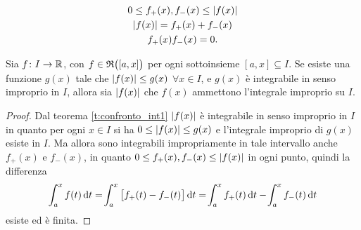 \[\begin{gathered}
0\leq f_+(x),f_-(x)\leq\left|{f(x)}\right|\\
\left|{f(x)}\right|=f_+(x)+f_-(x)\\
f_+(x)f_-(x)=0.
\end{gathered}\]
\begin{teorema} \label{t:confronto_int2}
Sia $f\colon I\to\mathbb{R}$, con $f\in\mathfrak{R}\big([a,x]\big)$ per ogni sottoinsieme $[a,x]\subseteq I$.
Se esiste una funzione $g(x)$ tale che $\left|{f(x)}\right|\leq g(x)$ $\forall x\in I$, e $g(x)$ è integrabile in senso improprio in $I$, allora sia $\left|{f(x)}\right|$ che $f(x)$ ammettono l'integrale improprio su $I$.
\end{teorema}
\begin{proof}
Dal teorema \ref{t:confronto_int1} $\left|{f(x)}\right|$ è integrabile in senso improprio in $I$ in quanto per ogni $x\in I$ si ha $0\leq\left|{f(x)}\right|\leq g(x)$ e l'integrale improprio di $g(x)$ esiste in $I$.
Ma allora sono integrabili impropriamente in tale intervallo anche $f_+(x)$ e $f_-(x)$, in quanto $0\leq f_+(x),f_-(x)\leq\left|{f(x)}\right|$ in ogni punto, quindi la differenza
\[
\int_a^xf(t)\,\textup{d} t=\!\int_a^x\big[f_+(t)-f_-(t)\big]\,\textup{d} t=\!\int_a^xf_+(t)\,\textup{d} t-\!\int_a^xf_-(t)\,\textup{d} t
\]
esiste ed è finita.
\end{proof}

